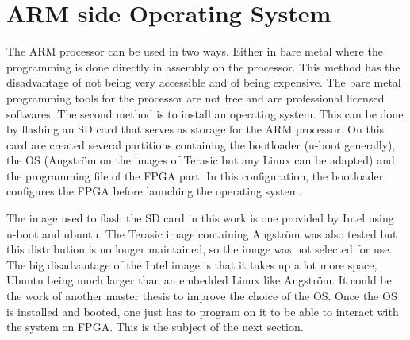 \section{ARM side Operating System}

The ARM processor can be used in two ways. Either in bare metal where the programming is done 
directly in assembly on the processor. This method has the disadvantage of not being very 
accessible and of being expensive. The bare metal programming tools for the processor are not 
free and are professional licensed softwares. The second method is to install an operating system. 
This can be done by flashing an SD card that serves as storage for the ARM processor. On this card 
are created several partitions containing the bootloader (u-boot generally), the OS (Angström on 
the images of Terasic but any Linux can be adapted) and the programming file of the FPGA part. In 
this configuration, the bootloader configures the FPGA before launching the operating system. 

The image used to flash the SD card in this work is one provided by Intel using u-boot and ubuntu. The 
Terasic image containing Angström was also tested but this distribution is no longer maintained, so 
the image was not selected for use. The big disadvantage of the Intel image is that it takes up a 
lot more space, Ubuntu being much larger than an embedded Linux like Angström. It could be the work of 
another master thesis to improve the choice of the OS. Once the OS is installed and booted, one just 
has to program on it to be able to interact with the system on FPGA. This is the subject of the next 
section.
